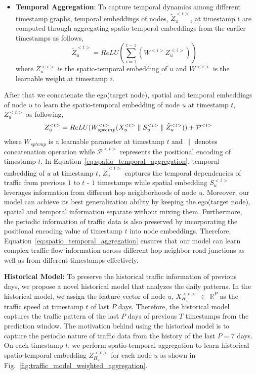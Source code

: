 \documentclass[runningheads]{llncs}
\begin{document}
\begin{itemize}
\item \textbf{Temporal Aggregation}: To capture temporal dynamics among different timestamp graphs, temporal embeddings of nodes, $\tilde{Z}_{u}^{<t>}$, at timestamp $t$ are computed through aggregating spatio-temporal embeddings from the earlier timestamps as follows,
\begin{equation}
\tilde{Z}_{u}^{<t>} = ReLU(\sum_{i = 1}^{t-1}(W^{<i>}Z_{u}^{<i>}))
\label{eq:upto_timestamp_embedding}
\end{equation}
 where $Z_u^{<i>}$ is the spatio-temporal embedding of $u$
and $W^{<i>}$ is the learnable weight at timestamp $i$.

\end{itemize}

After that we concatenate the ego(target node), spatial and temporal embeddings of node $u$ to learn the spatio-temporal embedding of node $u$ at timestamp $t$, $Z_{u}^{<t>}$ as following,
\begin{equation}
    Z_{u}^{<t>} = ReLU(W^{<t>}_{\tiny sptemp} ( X_u^{<t>} \parallel S_{u}^{<t>}  \parallel \tilde{Z}_{u}^{<t>})) + \mathcal{P}^{<t>}
    \label{eq:spatio_temporal_aggregation}
\end{equation}
 where $W_{sptemp}$ is a learnable parameter at timestamp $t$ and $\parallel$ denotes concatenation operation while $\mathcal{P}^{<t>}$ represents the positional encoding of timestamp $t$. In Equation~\ref{eq:spatio_temporal_aggregation}, 
temporal embedding of $u$ at timestamp $t$, $ \tilde{Z}_{u}^{<t>}$ captures the temporal dependencies of traffic from previous $1$ to $t$ - $1$ timestamps while spatial embedding $S_{u}^{<t>}$ leverages  information from different hop neighborhoods of node $u$. Moreover, our model can achieve its best generalization ability by keeping the ego(target node), spatial and temporal information separate without mixing them.  Furthermore, the periodic information of traffic data is also preserved by incorporating the positional encoding value of timestamp $t$ into node embeddings. Therefore, Equation~\ref{eq:spatio_temporal_aggregation} ensures that our model can learn complex traffic flow information across different hop neighbor road junctions as well as from different timestamps effectively. 


\noindent
\textbf{Historical Model:} 
To preserve the historical traffic information of previous days, we propose a novel historical model that analyzes the daily patterns. In the historical model, we assign the feature vector of node $u$, $X^{<t>}_{H_{u}}$ $\in$ $\mathbb{R}^{P}$ as the traffic speed  at timestamp $t$ of last $P$ days. Therefore, the historical model captures the traffic pattern of the last $P$ days of previous $T$ timestamps from the prediction window. The motivation behind using the historical model is to capture the periodic nature of traffic data from the history of the last $P=7$ days. On each timestamp $t$, we perform spatio-temporal aggregation to learn historical spatio-temporal embedding  $Z_{H_u}^{<t>}$  for  each node $u$ as shown in Fig.~\ref{fig:traffic_model_weighted_aggregation}. 
\end{document}
